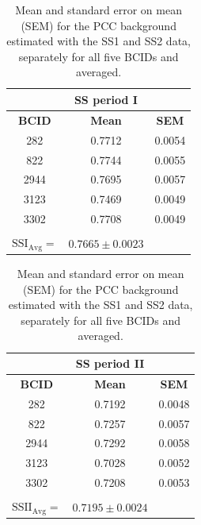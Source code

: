 \begin{table}[h!]
  \begin{center}
    \caption{Mean and standard error on mean (SEM) for the PCC background estimated with the SS1 and SS2 data, separately for all five BCIDs and averaged.}
    \label{ss_per_bx}
    \begin{tabular}{|c | c | c | }
      \multicolumn{1}{c}{} & \multicolumn{1}{c}{\textbf{SS period I}} & \multicolumn{1}{c}{}  \\
      \hline
 \textbf{BCID}   & \textbf{Mean}   &  \textbf{SEM}\\
     \hline %
      282 & 0.7712 & 0.0054\\
      \hline
      822 & 0.7744 & 0.0055\\ 
      \hline
      2944 & 0.7695 & 0.0057\\ 
      \hline
      3123 & 0.7469 & 0.0049\\ 
      \hline
      3302 & 0.7708 & 0.0049\\ 
      \hline
      \multicolumn{1}{c}{} & \multicolumn{1}{c}{} & \multicolumn{1}{c}{}\\
      \multicolumn{1}{c}{$\text{SSI}_{\text{Avg}}=$} & \multicolumn{1}{l}{$0.7665 \pm 0.0023$} & \multicolumn{1}{c}{}\\
    \end{tabular}
    \hspace{0.5cm}
    \begin{tabular}{|c | c | c | }
      \multicolumn{1}{c}{} & \multicolumn{1}{c}{\textbf{SS period II}} & \multicolumn{1}{c}{ }  \\
      \hline
 \textbf{BCID}   & \textbf{Mean}   &  \textbf{SEM}\\
     \hline %
      282 & 0.7192 & 0.0048\\
      \hline
      822 & 0.7257 & 0.0057\\ 
      \hline
      2944 & 0.7292 & 0.0058\\ 
      \hline
      3123 & 0.7028 & 0.0052\\ 
      \hline
      3302 & 0.7208 & 0.0053\\ 
      \hline
      \multicolumn{1}{c}{} & \multicolumn{1}{c}{} & \multicolumn{1}{c}{}\\
      \multicolumn{1}{c}{$\text{SSII}_{\text{Avg}}=$} & \multicolumn{1}{l}{$ 0.7195 \pm 0.0024$} & \multicolumn{1}{c}{}
    \end{tabular}   
  \end{center}
\end{table}


